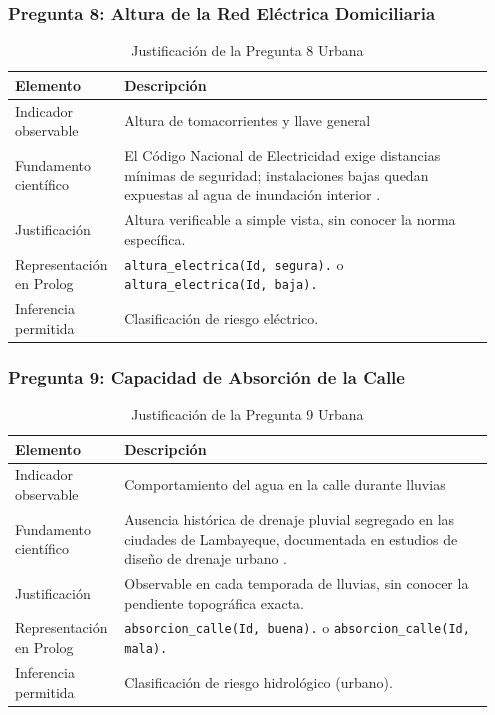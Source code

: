 \documentclass[12pt, letterpaper]{article}
\begin{document}
\subsubsection*{Pregunta 8: Altura de la Red Eléctrica Domiciliaria}
\begin{table}[H]
\centering
\caption{Justificación de la Pregunta 8 Urbana}
\label{tab:p8u}
\begin{tabular}{@{}p{0.2\linewidth}p{0.75\linewidth}@{}}
\toprule
\textbf{Elemento} & \textbf{Descripción} \\ \midrule
Indicador observable & Altura de tomacorrientes y llave general \\
Fundamento científico & El Código Nacional de Electricidad exige distancias mínimas de seguridad; instalaciones bajas quedan expuestas al agua de inundación interior \parencite{osinergmin_cne}. \\
Justificación & Altura verificable a simple vista, sin conocer la norma específica. \\
Representación en Prolog & \texttt{altura\_electrica(Id, segura).} o \texttt{altura\_electrica(Id, baja).} \\
Inferencia permitida & Clasificación de riesgo eléctrico. \\ \bottomrule
\end{tabular}
\end{table}

\subsubsection*{Pregunta 9: Capacidad de Absorción de la Calle}
\begin{table}[H]
\centering
\caption{Justificación de la Pregunta 9 Urbana}
\label{tab:p9u}
\begin{tabular}{@{}p{0.2\linewidth}p{0.75\linewidth}@{}}
\toprule
\textbf{Elemento} & \textbf{Descripción} \\ \midrule
Indicador observable & Comportamiento del agua en la calle durante lluvias \\
Fundamento científico & Ausencia histórica de drenaje pluvial segregado en las ciudades de Lambayeque, documentada en estudios de diseño de drenaje urbano \parencite{typsa_drenaje, usat_drenaje}. \\
Justificación & Observable en cada temporada de lluvias, sin conocer la pendiente topográfica exacta. \\
Representación en Prolog & \texttt{absorcion\_calle(Id, buena).} o \texttt{absorcion\_calle(Id, mala).} \\
Inferencia permitida & Clasificación de riesgo hidrológico (urbano). \\ \bottomrule
\end{tabular}
\end{table}
\end{document}
